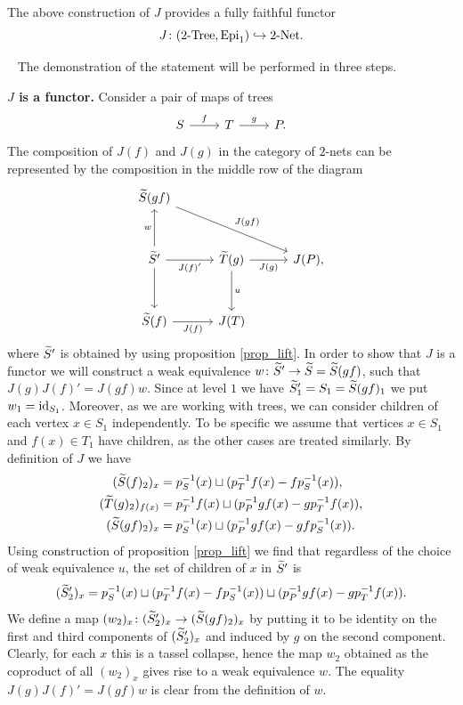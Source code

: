 \documentclass[letterpaper,12pt,leqno]{article}
\numberwithin{equation}{theorem}
\def\Epi{\mathrm{Epi}}
\def\Net{\textrm{-}\mathrm{Net}}
\def\proof{\noindent{\em Proof:}\ }
\def\Tree{\textrm{-}\mathrm{Tree}}
\begin{document}
\begin{theorem}
The above construction of $J$ provides a fully faithful functor
$$
J\from (2\Tree, \Epi_1) \into 2\Net.
$$
\end{theorem}
\proof
The demonstration of the statement will be performed in three steps.

{\bf $J$ is a functor.} Consider a pair of maps of trees
$$
\begin{tikzcd}
S \ar[r, "f"] & T \ar[r, "g"] & P.
\end{tikzcd}
$$
The composition of $J(f)$ and $J(g)$ in the category of $2$-nets can be represented by the composition in the middle row of the diagram
$$
\begin{tikzcd}[sep=3em]
\wtilde S(gf) \ar[rrd, "J(gf)"] & & \\
\wtilde S' \ar[d] \ar[u, "w"] \ar[r, "J(f)'"'] & \wtilde T(g) \ar[d, "u"] \ar[r, "J(g)"'] & J(P), \\
\wtilde S(f) \ar[r, "J(f)"'] & J(T) &
\end{tikzcd}
$$
where $\widetilde S'$ is obtained by using proposition \ref{prop_lift}. In order to show that $J$ is a functor we will construct a weak equivalence $w\colon \widetilde S' \to \widetilde S = \widetilde S(gf)$,
such that $J(g) J(f)' = J(gf) w$. Since at level $1$ we have $\widetilde S'_1 = S_1 = \widetilde S(gf)_1$ we put $w_1 = \mathrm{id}_{S_1}$. Moreover, as we are working with trees, we can consider children of each vertex $x \in S_1$ independently. To be specific we assume that vertices $x \in S_1$ and $f(x) \in T_1$
have children, as the other cases are treated similarly. By definition of $J$ we have
\begin{align*}
(\widetilde S(f)_2)_{x} &= p_S^{-1}(x) \sqcup (p_T^{-1} f(x) - f p_S^{-1}(x)), \\
(\widetilde T(g)_2)_{f(x)} &= p_T^{-1}f(x) \sqcup (p_P^{-1} gf(x) - g p_T^{-1}f(x)), \\
(\widetilde S(gf)_2)_{x} &= p_S^{-1}(x) \sqcup (p_P^{-1} gf(x) - gfp_S^{-1}(x)).
\end{align*}
Using construction of proposition \ref{prop_lift} we find that regardless of the choice of weak equivalence $u$, the set of children of $x$ in $\widetilde S'$ is
$$
(\widetilde S'_2)_x = p_S^{-1}(x) \sqcup (p_T^{-1} f(x) - f p_S^{-1}(x)) \sqcup (p_P^{-1} gf(x) - g p_T^{-1}f(x)).
$$
We define a map $(w_2)_x \colon (\widetilde S'_2)_x \to (\widetilde S(gf)_2)_x$ by putting it to be identity on the first and third components of $(\widetilde S'_2)_x$ and induced by $g$ on the second component.
Clearly, for each $x$ this is a tassel collapse, hence the map $w_2$ obtained as the coproduct of all $(w_2)_x$ gives rise to a weak equivalence $w$. The equality $J(g) J(f)' = J(gf) w$ is clear from the
definition of $w$.
\end{document}

